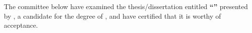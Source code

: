 %
%

\begin{titlepage}
\begin{large}
\begin{flushleft}
The committee below have examined the thesis/dissertation entitled
{\bf ``\THESISTITLE''} presented by {\bf \THESISAUTHOR},
a candidate for the degree of {\bf \THESISDEGREE},
and have certified that it is worthy of acceptance.
\end{flushleft}

\begin{flushright}




\end{flushright}
\end{large}
\end{titlepage}

